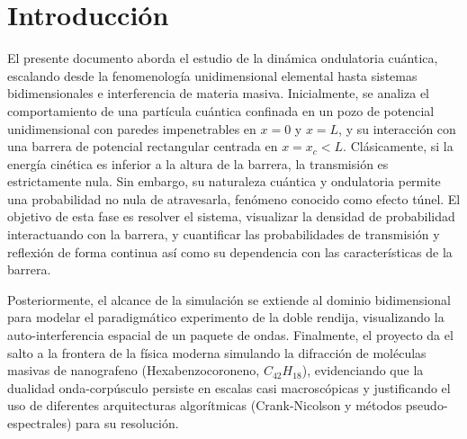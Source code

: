 \section{Introducción}

El presente documento aborda el estudio de la dinámica ondulatoria cuántica, escalando desde la fenomenología unidimensional elemental hasta sistemas bidimensionales e interferencia de materia masiva. Inicialmente, se analiza el comportamiento de una partícula cuántica confinada en un pozo de potencial unidimensional con paredes impenetrables en $x=0$ y $x=L$, y su interacción con una barrera de potencial rectangular centrada en $x=x_c<L$. Clásicamente, si la energía cinética es inferior a la altura de la barrera, la transmisión es estrictamente nula. Sin embargo, su naturaleza cuántica y ondulatoria permite una probabilidad no nula de atravesarla, fenómeno conocido como efecto túnel. El objetivo de esta fase es resolver el sistema, visualizar la densidad de probabilidad interactuando con la barrera, y cuantificar las probabilidades de transmisión y reflexión de forma continua así como su dependencia con las características de la barrera.

Posteriormente, el alcance de la simulación se extiende al dominio bidimensional para modelar el paradigmático experimento de la doble rendija, visualizando la auto-interferencia espacial de un paquete de ondas. Finalmente, el proyecto da el salto a la frontera de la física moderna simulando la difracción de moléculas masivas de nanografeno (Hexabenzocoroneno, $C_{42}H_{18}$), evidenciando que la dualidad onda-corpúsculo persiste en escalas casi macroscópicas y justificando el uso de diferentes arquitecturas algorítmicas (Crank-Nicolson y métodos pseudo-espectrales) para su resolución.